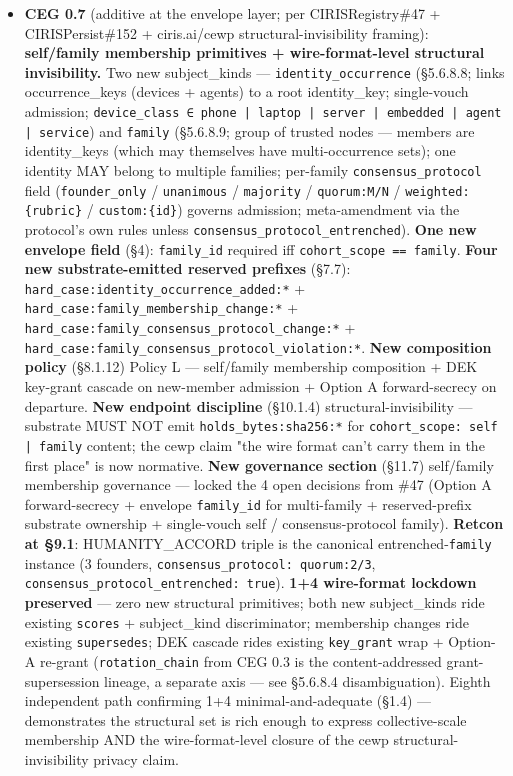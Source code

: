 \documentclass[10pt]{article}
\begin{document}
\begin{itemize}
\item \textbf{CEG 0.7} (additive at the envelope layer; per CIRISRegistry\#47 + CIRISPersist\#152 + ciris.ai/cewp structural-invisibility framing): \textbf{self/family membership primitives + wire-format-level structural invisibility.} Two new subject\_kinds — \texttt{identity\_occurrence} (§5.6.8.8; links occurrence\_keys (devices + agents) to a root identity\_key; single-vouch admission; \texttt{device\_class ∈ phone | laptop | server | embedded | agent | service}) and \texttt{family} (§5.6.8.9; group of trusted nodes — members are identity\_keys (which may themselves have multi-occurrence sets); one identity MAY belong to multiple families; per-family \texttt{consensus\_protocol} field (\texttt{founder\_only} / \texttt{unanimous} / \texttt{majority} / \texttt{quorum:M/N} / \texttt{weighted:\{rubric\}} / \texttt{custom:\{id\}}) governs admission; meta-amendment via the protocol's own rules unless \texttt{consensus\_protocol\_entrenched}). \textbf{One new envelope field} (§4): \texttt{family\_id} required iff \texttt{cohort\_scope == family}. \textbf{Four new substrate-emitted reserved prefixes} (§7.7): \texttt{hard\_case:identity\_occurrence\_added:*} + \texttt{hard\_case:family\_membership\_change:*} + \texttt{hard\_case:family\_consensus\_protocol\_change:*} + \texttt{hard\_case:family\_consensus\_protocol\_violation:*}. \textbf{New composition policy} (§8.1.12) Policy L — self/family membership composition + DEK key-grant cascade on new-member admission + Option A forward-secrecy on departure. \textbf{New endpoint discipline} (§10.1.4) structural-invisibility — substrate MUST NOT emit \texttt{holds\_bytes:sha256:*} for \texttt{cohort\_scope: self | family} content; the cewp claim "the wire format can't carry them in the first place" is now normative. \textbf{New governance section} (§11.7) self/family membership governance — locked the 4 open decisions from \#47 (Option A forward-secrecy + envelope \texttt{family\_id} for multi-family + reserved-prefix substrate ownership + single-vouch self / consensus-protocol family). \textbf{Retcon at §9.1}: HUMANITY\_ACCORD triple is the canonical entrenched-\texttt{family} instance (3 founders, \texttt{consensus\_protocol: quorum:2/3}, \texttt{consensus\_protocol\_entrenched: true}). \textbf{1+4 wire-format lockdown preserved} — zero new structural primitives; both new subject\_kinds ride existing \texttt{scores} + subject\_kind discriminator; membership changes ride existing \texttt{supersedes}; DEK cascade rides existing \texttt{key\_grant} wrap + Option-A re-grant (\texttt{rotation\_chain} from CEG 0.3 is the content-addressed grant-supersession lineage, a separate axis — see §5.6.8.4 disambiguation). Eighth independent path confirming 1+4 minimal-and-adequate (§1.4) — demonstrates the structural set is rich enough to express collective-scale membership AND the wire-format-level closure of the cewp structural-invisibility privacy claim.

\end{itemize}
\end{document}
